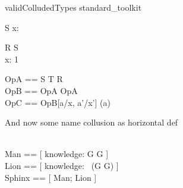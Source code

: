 \begin{zsection}
\SECTION validColludedTypes \parents standard\_toolkit
\end{zsection}

\begin{schema}{S}
   x: \nat
\end{schema}


\begin{schema}{R}
  S \\
  x: 1 
\end{schema}

\begin{zed}
   OpA == S \lor T \lor R
\\
   OpB == \Delta OpA \semi \Xi OpA
\\
   OpC == OpB[a/x, a'/x'] \hide (a)
\end{zed}

And now some name collusion as horizontal def
\begin{zed}
   [G] \\
   Man  == [ knowledge: G \fun G ] \\
   Lion == [ knowledge: \power~(G \cross G) ] \\
   Sphinx == [ Man; Lion ]
\end{zed}
